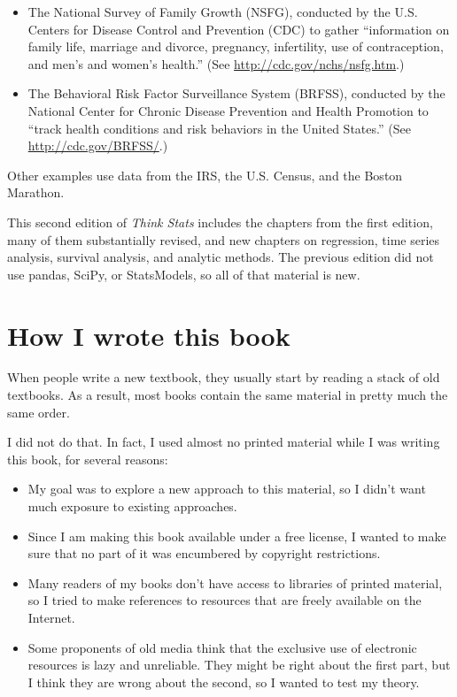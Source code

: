 \documentclass[12pt]{book}
\begin{document}
\begin{itemize}

\item The National Survey of Family Growth (NSFG), conducted by the
  U.S. Centers for Disease Control and Prevention (CDC) to gather
  ``information on family life, marriage and divorce, pregnancy,
  infertility, use of contraception, and men's and women's health.''
  (See \url{http://cdc.gov/nchs/nsfg.htm}.)

\item The Behavioral Risk Factor Surveillance System (BRFSS),
  conducted by the National Center for Chronic Disease Prevention and
  Health Promotion to ``track health conditions and risk behaviors in
  the United States.''  (See \url{http://cdc.gov/BRFSS/}.)

\end{itemize}

Other examples use data from the IRS, the U.S. Census, and
the Boston Marathon.

This second edition of {\it Think Stats\/} includes the chapters from
the first edition, many of them substantially revised, and new
chapters on regression, time series analysis, survival analysis,
and analytic methods.  The previous edition did not use pandas,
SciPy, or StatsModels, so all of that material is new.


\section{How I wrote this book}

When people write a new textbook, they usually start by
reading a stack of old textbooks.  As a result, most books
contain the same material in pretty much the same order.

I did not do that.  In fact, I used almost no printed material while I
was writing this book, for several reasons:

\begin{itemize}

\item My goal was to explore a new approach to this material, so I didn't
want much exposure to existing approaches.

\item Since I am making this book available under a free license, I wanted
to make sure that no part of it was encumbered by copyright restrictions.

\item Many readers of my books don't have access to libraries of
printed material, so I tried to make references to resources that are
freely available on the Internet.

\item Some proponents of old media think that the exclusive
use of electronic resources is lazy and unreliable.  They might be right
about the first part, but I think they are wrong about the second, so
I wanted to test my theory.


\end{itemize}
\end{document}
